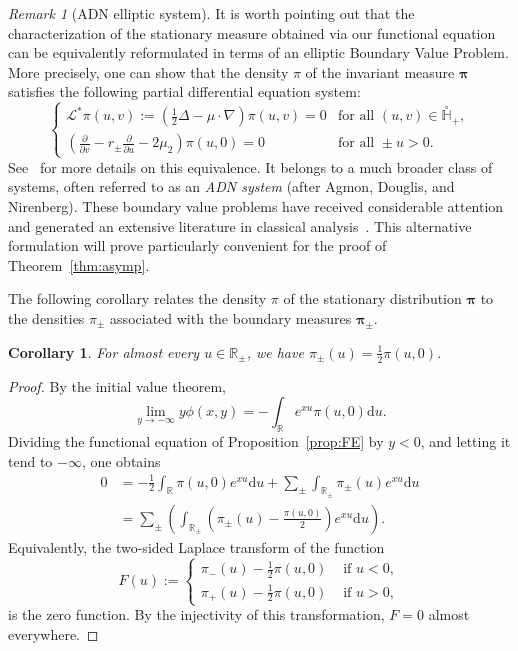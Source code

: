\documentclass{article}
\theoremstyle{plain}
\newtheorem{corollary}[theorem]{Corollary}
\theoremstyle{definition}
\theoremstyle{remark}
\newtheorem{remark}[theorem]{Remark}
\begin{document}
\begin{remark}[ADN elliptic system]\label{rem:ADN} It is worth pointing out that the characterization of the stationary measure obtained via our functional equation can be equivalently reformulated in terms of an elliptic Boundary Value Problem. More precisely, one can show that the density $\pi$ of the invariant measure $\boldsymbol{\pi}$ satisfies the following partial differential equation system:
\begin{equation}\label{eq:EBVP_system}
\left\{\begin{array}{ll}
\displaystyle\mathcal{L}^*\pi(u,v):=\left(\frac{1}{2}\Delta-\mu\cdot \nabla\right)\pi(u,v)=0 & \text{for all } (u,v)\in \overset{\circ}{\mathbb{H}}_+, \\[8pt]
\left(\displaystyle\frac{\partial}{\partial v}-r_\pm\frac{\partial}{\partial u}-2\mu_2\right)\pi(u,0)=0&\text{for all }\pm u>0.
\end{array}\right.
\end{equation}
See~\cite{Harrison_Reiman_1981} for more details on this equivalence. It belongs to a much broader class of systems, often referred to as an \textit{ADN system} (after Agmon, Douglis, and Nirenberg). These boundary value problems have received considerable attention and generated an extensive literature in classical analysis~\cite{Agmon_Douglis_Nirenberg_1959,Agmon_Douglis_Nirenberg_1964,Dauge_1988,Grisvard_2011}. This alternative formulation will prove particularly convenient for the proof of Theorem~\ref{thm:asymp}.
\end{remark}

The following corollary relates the density $\pi$ of the stationary distribution $\boldsymbol{\pi}$ to the densities $\pi_\pm$ associated with the boundary measures $\boldsymbol{\pi}_\pm$.

\begin{corollary} For almost every $u \in \mathbb{R}_\pm$, we have $\pi_\pm(u) = \frac{1}{2}\pi(u,0)$.
\end{corollary}
\begin{proof} 
    By the initial value theorem, 
    $$\lim_{y\to-\infty}y\phi(x,y)=-\int_{\mathbb R}e^{xu}\pi(u,0)\mathrm{d}u.$$
    Dividing the functional equation of Proposition~\ref{prop:FE} by $y < 0$, and letting it tend to $-\infty$, one obtains
    \begin{align*}
        0 &= -\frac{1}{2}\int_{\mathbb R}\pi(u,0)e^{xu}\mathrm{d}u+\sum_{\pm}\int_{\mathbb R_\pm}\pi_\pm(u)e^{xu}\mathrm{d}u\\
          &= \sum_{\pm}\left(\int_{\mathbb R_\pm}\left(\pi_\pm(u)-\frac{\pi(u,0)}{2}\right)e^{xu}\mathrm{d}u\right).
    \end{align*}
    Equivalently, the two-sided Laplace transform of the function 
    $$F(u):=\begin{cases}
         \pi_-(u)-\frac{1}{2}\pi(u,0) & \text{ if } u<0,  \\[2mm]
         \pi_+(u)-\frac{1}{2}\pi(u,0) & \text{ if } u>0,
    \end{cases}$$
    is the zero function. By the injectivity of this transformation, $F=0$ almost everywhere. 
\end{proof}
\end{document}
